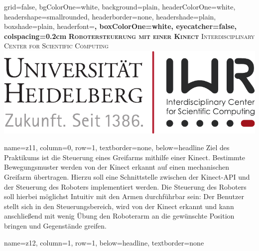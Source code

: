 \documentclass[portrait,a0paper]{baposter}
\begin{document}
\begin{poster}
  {
  grid=false,
  bgColorOne=white,
  background=plain,
  headerColorOne=white,
  headershape=smallrounded,
  headerborder=none,
  headershade=plain,
  boxshade=plain,
  headerfont=\Large\bf\textsf,
  boxColorOne=white,
  eyecatcher=false,
  colspacing=0.2cm
  }
  { } 
 {\bf\textsc{Robotersteuerung mit einer Kinect}\vspace{0.5em}}
  {
  \textsc{Interdisciplinary Center for Scientific Computing}  \vspace*{0.5em} \\

  }
  {%
    \includegraphics[scale=0.5]{imgs/IWR_Logo.pdf}
  }
 
 
    {
    name=z11,
    column=0,
    row=1,
    textborder=none,
    below=headline
    }
    {
Ziel des Praktikums ist die Steuerung eines Greifarms mithilfe einer Kinect.
Bestimmte Bewegungsmuster werden von der Kinect erkannt auf einen mechanischen Greifarm übertragen.
Hierzu soll eine Schnittstelle zwischen der Kinect-API und der Steuerung des Roboters implementiert werden.
Die Steuerung des Roboters soll hierbei möglichst Intuitiv mit den Armen durchführbar sein:
Der Benutzer stellt sich in den Steuerungsbereich, wird von der Kinect erkannt und kann anschließend mit wenig Übung den Roboterarm an die gewünschte Position bringen und Gegenstände greifen.
 }

    {
    name=z12,
    column=1,
    row=1,
    below=headline,
    textborder=none
    }
    {

}
\end{poster}
\end{document}
